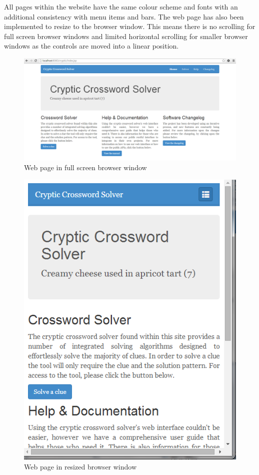 All pages within the website have the same colour scheme and fonts  with an
additional consistency with menu items and bars. The web page  has also been
implemented to resize to the browser window. This means  there is no scrolling
for full screen browser windows and limited horizontal  scrolling for smaller
browser windows as the controls are moved into a linear  position.

\begin{figure}[H]
	\centering
	\includegraphics[keepaspectratio=true,scale=0.4]{evidence/scrolling.png}
	\caption{Web page in full screen browser window}
\end{figure}

\begin{figure}[H]
	\centering
	\includegraphics[keepaspectratio=true,scale=0.5]{evidence/scrolling1.png}
	\caption{Web page in resized browser window}
\end{figure}

